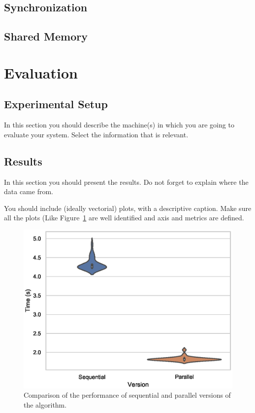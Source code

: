 \documentclass[runningheads]{llncs}
\begin{document}
\subsection{Synchronization}


\subsection{Shared Memory}


\section{Evaluation}

\subsection{Experimental Setup}

In this section you should describe the machine(s) in which you are going to evaluate your system. Select the information that is relevant.


\subsection{Results}

In this section you should present the results. Do not forget to explain where the data came from. 

You should include (ideally vectorial) plots, with a descriptive caption. Make sure all the plots (Like Figure~\ref{fig1} are well identified and axis and metrics are defined.

\begin{figure}[htbp]
\includegraphics[width=\textwidth]{code/performance.eps}
\caption{Comparison of the performance of sequential and parallel versions of the algorithm.} \label{fig1}
\end{figure}
\end{document}
